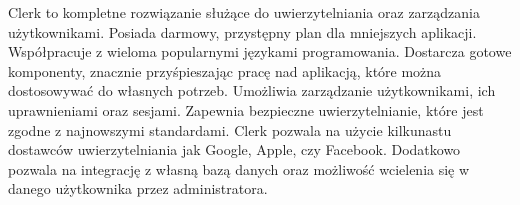 Clerk to kompletne rozwiązanie służące do uwierzytelniania oraz zarządzania użytkownikami. Posiada darmowy, przystępny plan dla mniejszych aplikacji. Współpracuje z wieloma popularnymi językami programowania. Dostarcza gotowe komponenty, znacznie przyśpieszając pracę nad aplikacją, które można dostosowywać do własnych potrzeb. Umożliwia zarządzanie użytkownikami, ich uprawnieniami oraz sesjami. Zapewnia bezpieczne uwierzytelnianie, które jest zgodne z najnowszymi standardami. Clerk pozwala na użycie kilkunastu dostawców uwierzytelniania jak Google, Apple, czy Facebook. Dodatkowo pozwala na integrację z własną bazą danych oraz możliwość wcielenia się w danego użytkownika przez administratora. \autocite{clerk}